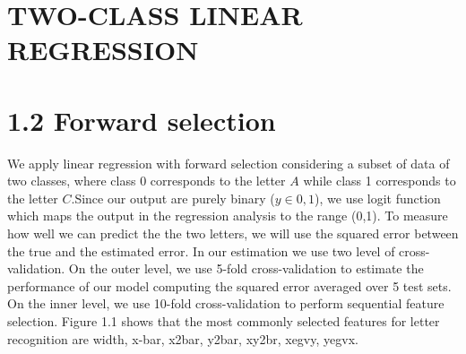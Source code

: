 \section*{TWO-CLASS LINEAR REGRESSION}

\section*{1.2 Forward selection}
\setcounter{section}{2}
We apply linear regression with forward selection considering a subset of data of two classes, where class 0 corresponds to the letter $A$ while class 1 corresponds to the letter $C$.Since our output are purely binary ($y \in {0,1}$), we use logit function which maps the output in the regression analysis to the range (0,1). To measure how well we can predict the the two letters, we will use the squared error between the true and the estimated error. In our estimation we  use two level of cross-validation. On the outer level, we use 5-fold cross-validation  to estimate the performance of our model computing the squared error averaged over 5 test sets. On the inner level, we use 10-fold cross-validation to perform sequential feature selection. Figure 1.1 shows that the most commonly selected features for letter recognition are width, x-bar, x2bar, y2bar, xy2br, xegvy, yegvx.


